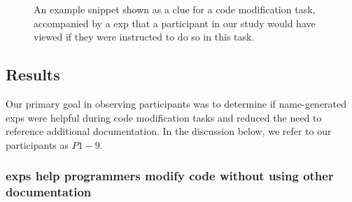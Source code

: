 \begin{figure}
\centering
{}
\caption{An example snippet shown as a clue for a code modification task, accompanied by a \gls{exp} that a participant in our study would have viewed if they were instructed to do so in this task.}
\label{fig:study_snippet}
\end{figure}
\fi

\subsection{Results}

Our primary goal in observing participants was to determine if \Gls{name}-generated \glspl{exp} were helpful  during code modification tasks and reduced the need to reference additional documentation.
In the discussion below, we refer to our participants as $P{1-9}$.

\subsubsection{\Glspl{exp} help programmers modify code without using other documentation}

